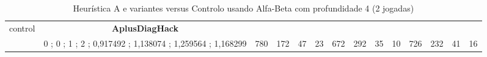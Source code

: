 \begin{table}[H]
{\begin{tabular}{|c|c|c|c|c|c|c|c|c|c|c|c|c|c|}
control & \cellcolor{blue!15}\textbf{AplusDiagHack}& {\color[HTML]{00009B} } & {\color[HTML]{9A0000} } & {\color[HTML]{009901} } &  & {\color[HTML]{00009B} } & {\color[HTML]{9A0000} } & {\color[HTML]{009901} } &  & {\color[HTML]{00009B} } & {\color[HTML]{9A0000} } & {\color[HTML]{009901} } &  \\ 
 & \cellcolor{ blue!15}0 ; 0 ; 1 ; 2 ; 0,917492 ; 1,138074 ; 1,259564 ; 1,168299 & \multirow{-2}{*}{{\color[HTML]{00009B} 780}} & \multirow{-2}{*}{{\color[HTML]{9A0000} 172}} & \multirow{-2}{*}{{\color[HTML]{009901} 47}} & \multirow{-2}{*}{23} & \multirow{-2}{*}{{\color[HTML]{00009B} 672}} & \multirow{-2}{*}{{\color[HTML]{9A0000} 292}} & \multirow{-2}{*}{{\color[HTML]{009901} 35}} & \multirow{-2}{*}{10} & \multirow{-2}{*}{{\color[HTML]{00009B} 726}} & \multirow{-2}{*}{{\color[HTML]{9A0000} 232}} & \multirow{-2}{*}{{\color[HTML]{009901} 41}} & \multirow{-2}{*}{16} \\ \hline
\end{tabular}} \caption{Heurística A e variantes versus Controlo usando Alfa-Beta com profundidade 4 (2 jogadas)} \label{Acontrol} \end{table}
